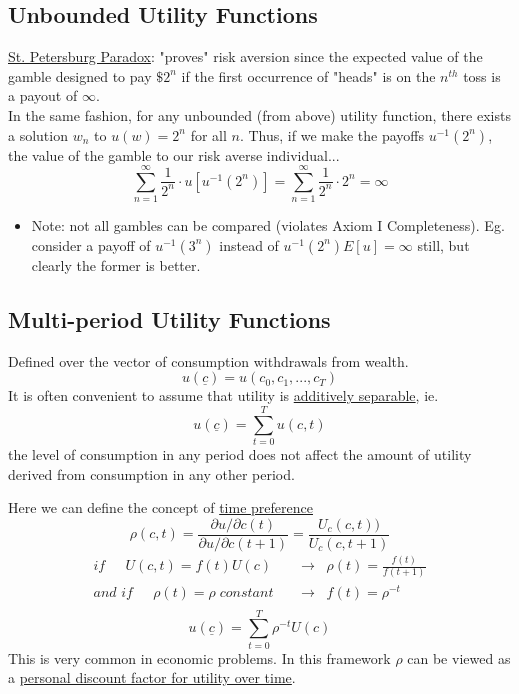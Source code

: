 \documentclass[
14pt,notheorems,hyperref={pdfauthor=whatever}
]{beamer}
\begin{document}
\subsection{Unbounded Utility Functions}
\begin{frame}
\underline{St. Petersburg Paradox}: "proves" risk aversion since the expected value of the gamble designed to pay $\$2^n$ if the first occurrence of "heads" is on the $n^{th}$ toss is a payout of $\infty$.\\
\hfill \break
In the same fashion, for any unbounded (from above) utility function, there exists a solution $w_n$ to $u(w)=2^n$ for all $n$. Thus, if we make the payoffs $u^{-1}(2^n)$, the value of the gamble to our risk averse individual...
\[\sum_{n=1}^\infty \frac{1}{2^n} \cdot u[u^{-1}(2^n)] = \sum_{n=1}^\infty \frac{1}{2^n} \cdot 2^n = \infty\]
\begin{itemize}
    \item Note: not all gambles can be compared (violates Axiom I Completeness). Eg. consider a payoff of $u^{-1}(3^n)$ instead of $u^{-1}(2^n)$\break$E[u]=\infty$ still, but clearly the former is better.
\end{itemize}
\end{frame}

\subsection{Multi-period Utility Functions}
\begin{frame}
Defined over the vector of consumption withdrawals from wealth.\\
\[u(\underline{c}) = u(c_0, c_1, ..., c_T)\]
It is often convenient to assume that utility is \underline{additively separable}, ie.\\
\[u(\underline{c}) = \sum_{t=0}^T u(c,t)\]
the level of consumption in any period does not affect the amount of utility derived from consumption in any other period.\\
\end{frame}

\begin{frame}
Here we can define the concept of \underline{time preference}\\
\[\rho(c,t) = \frac{\partial u/ \partial c(t)}{\partial u/ \partial c(t+1)} = \frac{U_c(c,t))}{U_c(c,t+1)}\]
\begin{align*}
    \textit{if }\;\;\;\; U(c,t) = f(t) U(c) \;\;&\rightarrow\;\; \rho(t) = \frac{f(t)}{f(t+1)}\\
    \textit{and if }\;\;\;\; \rho(t) = \rho\;\textit{constant } \;\;&\rightarrow\;\; f(t)=\rho^{-t}\\
\end{align*}
\[u(\underline{c}) = \sum_{t=0}^T \rho^{-t}U(c)\]
This is very common in economic problems. In this framework $\rho$ can be viewed as a \underline{personal discount factor for utility over time}. 
\end{frame}
\end{document}
